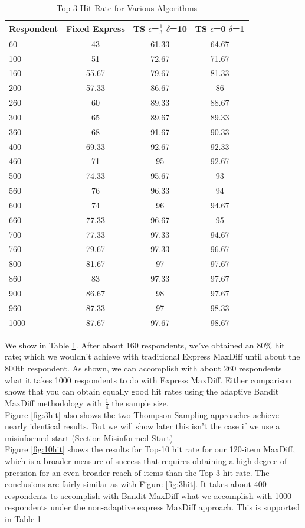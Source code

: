 \documentclass[mksc,blindrev]{informs3} %
\begin{document}
\begin{table}
\begin{center}
\begin{tabular}{l | c | c | c}
 Respondent& Fixed Express &  TS $\epsilon$=$\frac{1}{3}$ $\delta$=10  &TS $\epsilon$=0 $\delta$=1 \\
\hline
60&43&61.33&64.67\\
100&51&72.67&71.67\\
160&55.67&79.67&81.33 \\
200&57.33&86.67&86\\
260& 60&89.33&88.67\\
300& 65&89.67&89.33\\
360&68&91.67&90.33\\
400& 69.33&92.67&92.33\\
460&71&95&92.67 \\
500& 74.33&95.67&93\\
560&76&96.33&94\\
600&74&96&94.67\\
660& 77.33&96.67&95\\
700& 77.33&97.33&94.67\\
760&79.67&97.33&96.67\\
800& 81.67&97&97.67\\
860&83&97.33&97.67\\
900&86.67&98&97.67 \\
960&87.33&97&98.33\\
1000& 87.67&97.67&98.67\\
\hline
\end{tabular}
\end{center}
\caption{Top 3 Hit Rate for Various Algorithms}
\label{table:top3}
\end{table}
 We show in Table \ref{table:top3}. After about 160 respondents, we’ve obtained an 80\% hit rate; which we wouldn’t achieve with traditional Express MaxDiff until about the 800th respondent.  As shown, we can accomplish with about 260 respondents what it takes 1000 respondents to do with Express MaxDiff.  Either comparison shows that you can obtain equally good hit rates using the adaptive Bandit MaxDiff methodology with $\frac{1}{4}$ the sample size.\\
Figure \ref{fig:3hit} also shows the two Thompson Sampling approaches achieve nearly identical results. But we will show later this isn’t the case if we use a misinformed start (Section Misinformed Start)\\
Figure \ref{fig:10hit} shows the results for Top-10 hit rate for our 120-item MaxDiff, which is a broader measure of success that requires obtaining a high degree of precision for an even broader reach of items than the Top-3 hit rate.  The conclusions are fairly similar as with Figure \ref{fig:3hit}.  It takes about 400 respondents to accomplish with Bandit MaxDiff what we accomplish with 1000 respondents under the non-adaptive express MaxDiff approach. This is supported in Table \ref{table:top3}\\
\end{document}
